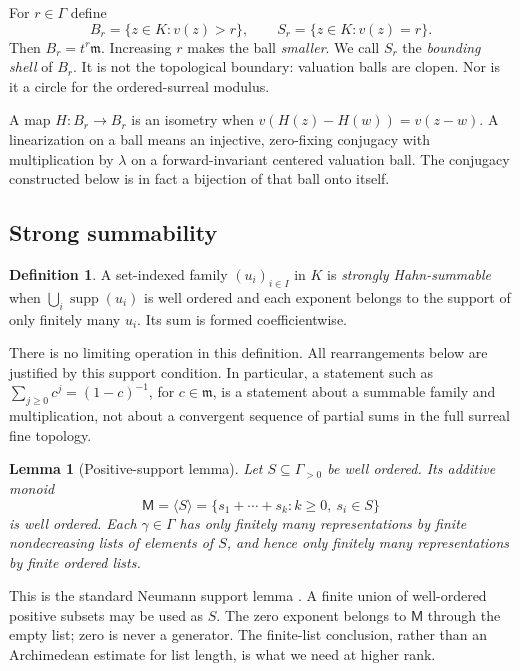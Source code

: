 \documentclass[11pt,letterpaper]{article}
\numberwithin{equation}{section}
\theoremstyle{plain}
\newtheorem{lemma}[theorem]{Lemma}
\theoremstyle{definition}
\newtheorem{definition}[theorem]{Definition}
\theoremstyle{remark}
\newcommand{\mm}{\mathfrak m}
\newcommand{\supp}{\operatorname{supp}}
\newcommand{\M}{\mathsf M}
\begin{document}
For $r\in\Gamma$ define
\begin{equation}\label{eq:balls}
 B_r=\{z\in K:v(z)>r\},\qquad S_r=\{z\in K:v(z)=r\}.
\end{equation}
Then $B_r=t^r\mm$. Increasing $r$ makes the ball \emph{smaller}.
We call $S_r$ the \emph{bounding shell} of $B_r$. It is not the topological
boundary: valuation balls are clopen. Nor is it a circle for the
ordered-surreal modulus.

A map $H:B_r\to B_r$ is an isometry when
$v(H(z)-H(w))=v(z-w)$. A linearization on a ball means an injective,
zero-fixing conjugacy with multiplication by $\lambda$ on a forward-invariant
centered valuation ball. The conjugacy constructed below is in fact a
bijection of that ball onto itself.

\subsection{Strong summability}

\begin{definition}\label{def:summable}
A set-indexed family $(u_i)_{i\in I}$ in $K$ is \emph{strongly Hahn-summable}
when $\bigcup_i\supp(u_i)$ is well ordered and each exponent belongs to the
support of only finitely many $u_i$. Its sum is formed coefficientwise.
\end{definition}

There is no limiting operation in this definition. All rearrangements below
are justified by this support condition. In particular, a statement such as
$\sum_{j\ge0}c^j=(1-c)^{-1}$, for $c\in\mm$, is a statement about a
summable family and multiplication, not about a convergent sequence of partial
sums in the full surreal fine topology.

\begin{lemma}[Positive-support lemma]\label{lem:neumann}
Let $S\subseteq\Gamma_{>0}$ be well ordered. Its additive monoid
\[
 \M=\langle S\rangle=\{s_1+\cdots+s_k:k\ge0,\ s_i\in S\}
\]
is well ordered. Each $\gamma\in\Gamma$ has only finitely many
representations by finite nondecreasing lists of elements of $S$, and hence
only finitely many representations by finite ordered lists.
\end{lemma}

This is the standard Neumann support lemma \cite{neumann}. A finite union of
well-ordered positive subsets may be used as $S$. The zero exponent belongs
to $\M$ through the empty list; zero is never a generator. The finite-list
conclusion, rather than an Archimedean estimate for list length, is what we
need at higher rank.
\end{document}
